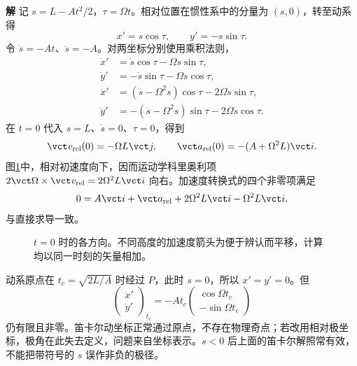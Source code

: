 \documentclass[11pt,openany,fontset=fandol]{ctexbook}
\theoremstyle{definition}\newtheorem{example}{例}[chapter]\newtheorem{exercise}{习题}[chapter]
\newcommand{\SolutionStart}{\par\medskip\ifdim\pagetotal>0pt\ifdim\dimexpr\pagegoal-\pagetotal\relax<3\baselineskip\newpage\fi\fi\noindent\textbf{解}\quad\ignorespaces}
\newenvironment{solution}{\SolutionStart}{\par\medskip}
\begin{document}
\begin{solution}
记 $s=L-At^2/2$，$\tau=\Omega t$。相对位置在惯性系中的分量为 $(s,0)$，转至动系得
\[
x'=s\cos\tau,\qquad y'=-s\sin\tau.
\]
令 $\dot s=-At$、$\ddot s=-A$。对两坐标分别使用乘积法则，
\[
\begin{aligned}
\dot x'&=\dot s\cos\tau-\Omega s\sin\tau,\\
\dot y'&=-\dot s\sin\tau-\Omega s\cos\tau,\\
\ddot x'&=(\ddot s-\Omega^2s)\cos\tau-2\Omega\dot s\sin\tau,\\
\ddot y'&=-(\ddot s-\Omega^2s)\sin\tau-2\Omega\dot s\cos\tau.
\end{aligned}
\]
在 $t=0$ 代入 $s=L$、$\dot s=0$、$\tau=0$，得到
\[
\vct v_{\rm rel}(0)=-\Omega L\vct j,\qquad
\vct a_{\rm rel}(0)=-(A+\Omega^2L)\vct i.
\]
图\ref{mp3:fig:l3-p10-s}中，相对初速度向下，因而运动学科里奥利项
$2\vct\Omega\times\vct v_{\rm rel}=2\Omega^2L\vct i$ 向右。加速度转换式的四个非零项满足
\[
0=A\vct i+\vct a_{\rm rel}
+2\Omega^2L\vct i-\Omega^2L\vct i,
\]
与直接求导一致。

\begin{figure}[H]\centering
{}
\caption{$t=0$ 时的各方向。不同高度的加速度箭头为便于辨认而平移，计算均以同一时刻的矢量相加。}\label{mp3:fig:l3-p10-s}
\end{figure}


动系原点在 $t_c=\sqrt{2L/A}$ 时经过 $P$，此时 $s=0$，所以 $x'=y'=0$。但
\[
\begin{pmatrix}\dot x'\\\dot y'\end{pmatrix}_{t_c}
=-At_c\begin{pmatrix}\cos\Omega t_c\\-\sin\Omega t_c\end{pmatrix}
\]
仍有限且非零。笛卡尔动坐标正常通过原点，不存在物理奇点；若改用相对极坐标，极角在此失去定义，问题来自坐标表示。$s<0$ 后上面的笛卡尔解照常有效，不能把带符号的 $s$ 误作非负的极径。

\end{solution}
\end{document}
